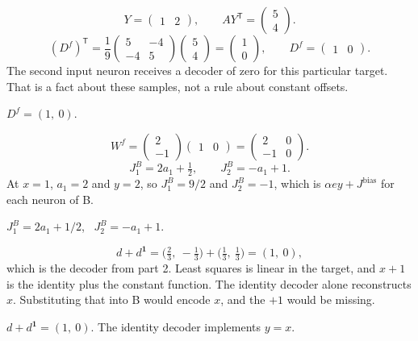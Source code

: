 \documentclass[11pt,letterpaper]{article}
\newcommand{\Jb}{J^{\mathrm{bias}}}
\newcommand{\ans}[1]{\par\vspace{2pt}{\bfseries #1}\quad}
\begin{document}
\ans{2.}
\[
Y = \begin{pmatrix} 1 & 2 \end{pmatrix}, \qquad
AY^{\mathsf T} = \begin{pmatrix} 5 \\ 4 \end{pmatrix}.
\]
\[
(D^f)^{\mathsf T}
  = \frac19 \begin{pmatrix} 5 & -4 \\ -4 & 5 \end{pmatrix}
    \begin{pmatrix} 5 \\ 4 \end{pmatrix}
  = \begin{pmatrix} 1 \\ 0 \end{pmatrix},
\qquad
D^f = \begin{pmatrix} 1 & 0 \end{pmatrix}.
\]
The second input neuron receives a decoder of zero for this particular target. That is a fact about these samples, not a rule about constant offsets.
\begin{result}
$D^f = (1,\ 0)$.
\end{result}

\ans{3.}
\[
W^f = \begin{pmatrix} 2 \\ -1 \end{pmatrix}
      \begin{pmatrix} 1 & 0 \end{pmatrix}
    = \begin{pmatrix} 2 & 0 \\ -1 & 0 \end{pmatrix}.
\]
\[
J_1^{B} = 2 a_1 + \tfrac12, \qquad
J_2^{B} = -a_1 + 1.
\]
At $x = 1$, $a_1 = 2$ and $y = 2$, so $J_1^{B} = 9/2$ and $J_2^{B} = -1$, which is $\alpha e y + \Jb$ for each neuron of B.
\begin{result}
$J_1^B = 2a_1 + 1/2$, \ $J_2^B = -a_1 + 1$.
\end{result}

\ans{4.}
\[
d + d^{\mathbf 1}
  = \bigl(\tfrac23,\ -\tfrac13\bigr) + \bigl(\tfrac13,\ \tfrac13\bigr)
  = (1,\ 0),
\]
which is the decoder from part 2. Least squares is linear in the target, and $x + 1$ is the identity plus the constant function. The identity decoder alone reconstructs $x$. Substituting that into B would encode $x$, and the $+1$ would be missing.
\begin{result}
$d + d^{\mathbf 1} = (1,\ 0)$. The identity decoder implements $y = x$.
\end{result}
\end{document}
